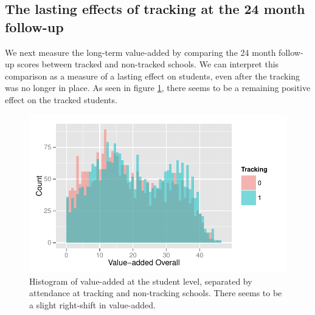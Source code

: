 \documentclass[11pt]{article}
\begin{document}
%
% 

 \subsection{The lasting effects of tracking at the 24 month follow-up}

We next measure the long-term value-added by comparing the 24 month follow-up scores between tracked and non-tracked schools. We can interpret this comparison as a measure of a lasting effect on students, even after the tracking was no longer in place. As seen in figure \ref{fig:va-hist}, there seems to be a remaining positive effect on the tracked students.

  \begin{figure}[H]
  	\centering
  	\includegraphics[scale=0.8]{../Figures/va-hist.pdf}
  	\caption{Histogram of value-added at the student level, separated by attendance at tracking and non-tracking schools.  There seems to be a slight right-shift in value-added.}
  	\label{fig:va-hist}
  \end{figure} 
\end{document}

